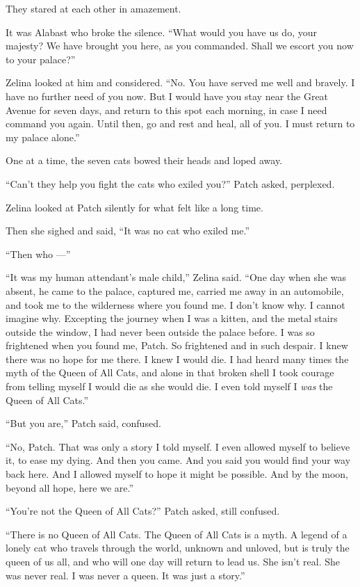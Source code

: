 \documentclass[ebook,oneside,openany,17pt]{memoir}
\newenvironment{tolerant}[1]{%
  \par\tolerance=#1\relax
}{%
  \par
}
\begin{document}
They stared at each other in amazement.

\begin{tolerant}{5000}
It was Alabast who broke the silence. “What would you have us do, your
majesty? We have brought you here, as you commanded. Shall we escort
you now to your palace?”
\end{tolerant}

Zelina looked at him and considered. “No. You have served me well and
bravely. I have no further need of you now. But I would have you stay
near the Great Avenue for seven days, and return to this spot each
morning, in case I need command you again. Until then, go and rest and
heal, all of you. I must return to my palace alone.”

One at a time, the seven cats bowed their heads and loped away.

“Can’t they help you fight the cats who exiled you?” Patch asked,
perplexed.

Zelina looked at Patch silently for what felt like a long time.

Then she sighed and said, “It was no cat who exiled me.”

“Then who —”

“It was my human attendant’s male child,” Zelina said. “One day when
she was absent, he came to the palace, captured me, carried me away in
an automobile, and took me to the wilderness where you found me. I
don’t know why. I cannot imagine why. Excepting the journey when I was
a kitten, and the metal stairs outside the window, I had never been
outside the palace before. I was so frightened when you found me,
Patch. So frightened and in such despair. I knew there was no hope for
me there. I knew I would die. I had heard many times the myth of the
Queen of All Cats, and alone in that broken shell I took courage from
telling myself I would die as she would die. I even told myself I
\emph{was} the Queen of All Cats.”

“But you are,” Patch said, confused.

“No, Patch. That was only a story I told myself. I even allowed myself
to believe it, to ease my dying. And then you came. And you said you
would find your way back here. And I allowed myself to hope it might
be possible. And by the moon, beyond all hope, here we are.”

“You’re not the Queen of All Cats?” Patch asked, still confused.

“There is no Queen of All Cats. The Queen of All Cats is a myth. A
legend of a lonely cat who travels through the world, unknown and
unloved, but is truly the queen of us all, and who will one day will
return to lead us. She isn’t real. She was never real. I was never a
queen. It was just a story.”
\end{document}
